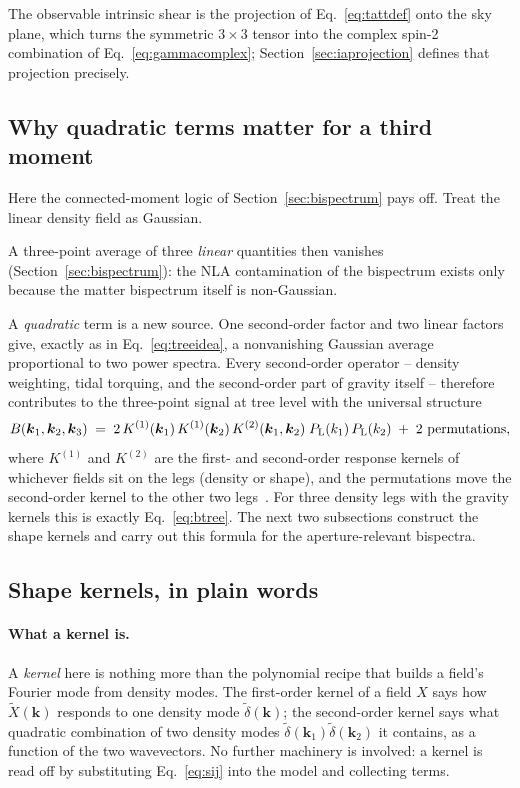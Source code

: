 \documentclass[11pt]{article}
\newcommand{\bk}{\boldsymbol{k}}
\numberwithin{equation}{section}
\begin{document}
The observable intrinsic shear is the projection of
Eq.~\eqref{eq:tattdef} onto the sky plane, which turns the symmetric
$3\times 3$ tensor into the complex spin-2 combination of
Eq.~\eqref{eq:gammacomplex}; Section~\ref{sec:iaprojection} defines
that projection precisely.

\subsection{Why quadratic terms matter for a third moment}
\label{sec:whyquadratic}

Here the connected-moment logic of Section~\ref{sec:bispectrum} pays
off.  Treat the linear density field as Gaussian.

A three-point average of three \emph{linear} quantities then
vanishes (Section~\ref{sec:bispectrum}): the NLA contamination of
the bispectrum exists only because the matter bispectrum itself is
non-Gaussian.

A \emph{quadratic} term is a new source.  One second-order factor
and two linear factors give, exactly as in Eq.~\eqref{eq:treeidea},
a nonvanishing Gaussian average proportional to two power spectra.
Every second-order operator -- density weighting, tidal torquing,
and the second-order part of gravity itself -- therefore contributes
to the three-point signal at tree level with the universal
structure
\begin{equation}
  B(\bk_1,\bk_2,\bk_3)
  \;=\;
  2\, K^{(1)}(\bk_1)\, K^{(1)}(\bk_2)\,
  K^{(2)}(\bk_1,\bk_2)\;
  P_{\rm L}(k_1)\, P_{\rm L}(k_2)
  \;+\; \text{2 permutations},
  \label{eq:treegeneral}
\end{equation}
where $K^{(1)}$ and $K^{(2)}$ are the first- and second-order
response kernels of whichever fields sit on the legs (density or
shape), and the permutations move the second-order kernel to the
other two legs~\cite{GomesTATT}.  For three density legs with the
gravity kernels this is exactly Eq.~\eqref{eq:btree}.  The next two
subsections construct the shape kernels and carry out this formula
for the aperture-relevant bispectra.

\subsection{Shape kernels, in plain words}
\label{sec:iakernels}

\paragraph{What a kernel is.}
A \emph{kernel} here is nothing more than the polynomial recipe that
builds a field's Fourier mode from density modes.  The first-order
kernel of a field $X$ says how $\tilde X(\bk)$ responds to one
density mode $\tilde\delta(\bk)$; the second-order kernel says what
quadratic combination of two density modes
$\tilde\delta(\bk_1)\tilde\delta(\bk_2)$ it contains, as a function
of the two wavevectors.  No further machinery is involved: a kernel
is read off by substituting Eq.~\eqref{eq:sij} into the model and
collecting terms.
\end{document}
